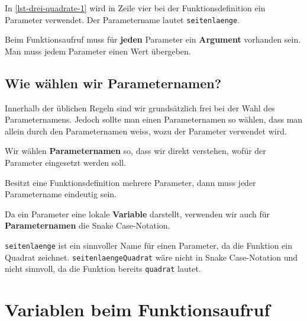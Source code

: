 \begin{example}
In \autoref{lst-drei-quadrate-1} wird in Zeile vier bei der Funktionsdefinition ein Parameter verwendet. Der Parametername lautet \lstinline{seitenlaenge}.
\end{example}

\begin{important}
Beim Funktionsaufruf muss für \textbf{jeden} Parameter ein \textbf{Argument} vorhanden sein. Man muss jedem Parameter einen Wert übergeben.
\end{important}

\subsection{Wie wählen wir Parameternamen?}

Innerhalb der üblichen Regeln sind wir grundsätzlich frei bei der Wahl des Parameternamens. Jedoch sollte man einen Parameternamen so wählen, dass man allein durch den Parameternamen weiss, wozu der Parameter verwendet wird.

\begin{cleancode}
Wir wählen \textbf{Parameternamen} so, dass wir direkt verstehen, wofür der Parameter eingesetzt werden soll.
\end{cleancode}

\begin{important}
Besitzt eine Funktionsdefinition mehrere Parameter, dann muss jeder Parametername eindeutig sein.
\end{important}

\begin{cleancode}
Da ein Parameter eine lokale \textbf{Variable} darstellt, verwenden wir auch für \textbf{Parameternamen} die Snake Case-Notation.
\end{cleancode}

\begin{example}
\lstinline{seitenlaenge} ist ein sinnvoller Name für einen Parameter, da die Funktion ein Quadrat zeichnet. \lstinline{seitenlaengeQuadrat} wäre nicht in Snake Case-Notation und nicht sinnvoll, da die Funktion bereits \lstinline{quadrat} lautet. 
\end{example}

\section{Variablen beim Funktionsaufruf}

